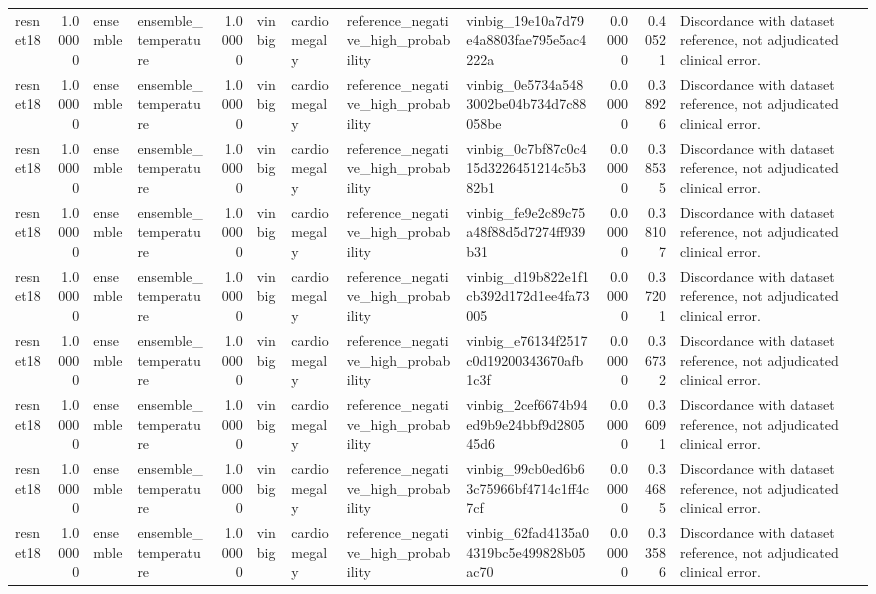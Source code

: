 \begin{tabular}{lrllrllllrrl}
resnet18 & 1.00000 & ensemble & ensemble\_temperature & 1.00000 & vinbig & cardiomegaly & reference\_negative\_high\_probability & vinbig\_19e10a7d79e4a8803fae795e5ac4222a & 0.00000 & 0.40521 & Discordance with dataset reference, not adjudicated clinical error. \\
resnet18 & 1.00000 & ensemble & ensemble\_temperature & 1.00000 & vinbig & cardiomegaly & reference\_negative\_high\_probability & vinbig\_0e5734a5483002be04b734d7c88058be & 0.00000 & 0.38926 & Discordance with dataset reference, not adjudicated clinical error. \\
resnet18 & 1.00000 & ensemble & ensemble\_temperature & 1.00000 & vinbig & cardiomegaly & reference\_negative\_high\_probability & vinbig\_0c7bf87c0c415d3226451214c5b382b1 & 0.00000 & 0.38535 & Discordance with dataset reference, not adjudicated clinical error. \\
resnet18 & 1.00000 & ensemble & ensemble\_temperature & 1.00000 & vinbig & cardiomegaly & reference\_negative\_high\_probability & vinbig\_fe9e2c89c75a48f88d5d7274ff939b31 & 0.00000 & 0.38107 & Discordance with dataset reference, not adjudicated clinical error. \\
resnet18 & 1.00000 & ensemble & ensemble\_temperature & 1.00000 & vinbig & cardiomegaly & reference\_negative\_high\_probability & vinbig\_d19b822e1f1cb392d172d1ee4fa73005 & 0.00000 & 0.37201 & Discordance with dataset reference, not adjudicated clinical error. \\
resnet18 & 1.00000 & ensemble & ensemble\_temperature & 1.00000 & vinbig & cardiomegaly & reference\_negative\_high\_probability & vinbig\_e76134f2517c0d19200343670afb1c3f & 0.00000 & 0.36732 & Discordance with dataset reference, not adjudicated clinical error. \\
resnet18 & 1.00000 & ensemble & ensemble\_temperature & 1.00000 & vinbig & cardiomegaly & reference\_negative\_high\_probability & vinbig\_2cef6674b94ed9b9e24bbf9d280545d6 & 0.00000 & 0.36091 & Discordance with dataset reference, not adjudicated clinical error. \\
resnet18 & 1.00000 & ensemble & ensemble\_temperature & 1.00000 & vinbig & cardiomegaly & reference\_negative\_high\_probability & vinbig\_99cb0ed6b63c75966bf4714c1ff4c7cf & 0.00000 & 0.34685 & Discordance with dataset reference, not adjudicated clinical error. \\
resnet18 & 1.00000 & ensemble & ensemble\_temperature & 1.00000 & vinbig & cardiomegaly & reference\_negative\_high\_probability & vinbig\_62fad4135a04319bc5e499828b05ac70 & 0.00000 & 0.33586 & Discordance with dataset reference, not adjudicated clinical error. \\

\end{tabular}
